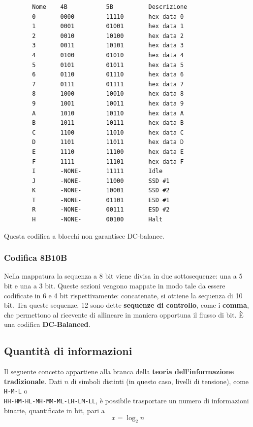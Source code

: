 \begin{footnotesize}
	\begin{verbatim}
		Nome    4B           5B          Descrizione
		0       0000         11110       hex data 0
		1       0001         01001       hex data 1
		2       0010         10100       hex data 2
		3       0011         10101       hex data 3
		4       0100         01010       hex data 4
		5       0101         01011       hex data 5
		6       0110         01110       hex data 6
		7       0111         01111       hex data 7
		8       1000         10010       hex data 8
		9       1001         10011       hex data 9
		A       1010         10110       hex data A
		B       1011         10111       hex data B
		C       1100         11010       hex data C
		D       1101         11011       hex data D
		E       1110         11100       hex data E
		F       1111         11101       hex data F
		I       -NONE-       11111       Idle
		J       -NONE-       11000       SSD #1
		K       -NONE-       10001       SSD #2
		T       -NONE-       01101       ESD #1
		R       -NONE-       00111       ESD #2
		H       -NONE-       00100       Halt
	\end{verbatim}
\end{footnotesize}
Questa codifica a blocchi non garantisce DC-balance.
\subsubsection{Codifica 8B10B}

Nella mappatura la sequenza a 8 bit viene divisa in due sottosequenze: una a 5 bit e una a 3 bit. Queste sezioni vengono mappate in modo tale da essere codificate in 6 e 4 bit rispettivamente: concatenate, si ottiene la sequenza di 10 bit. Tra queste sequenze, 12 sono dette \textbf{sequenze di controllo}, come i \textbf{comma}, che permettono al ricevente di allineare in maniera opportuna il flusso di bit. È una codifica \textbf{DC-Balanced}.

\newpage

\subsection{Quantità di informazioni}
Il seguente concetto appartiene alla branca della \textbf{teoria dell'informazione tradizionale}.
Dati $n$ di simboli distinti (in questo caso, livelli di tensione), come \verb|H-M-L| o \\ \verb|HH-HM-HL-MH-MM-ML-LH-LM-LL|, è possibile trasportare un numero di informazioni binarie, quantificate in bit, pari a 
$$
x= \log_2 n
$$


